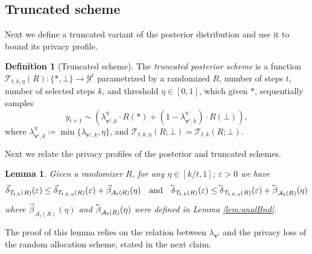 \documentclass{article}
\theoremstyle{plain}
\newtheorem{lemma}[theorem]{Lemma}
\theoremstyle{definition}
\newtheorem{definition}[theorem]{Definition}
\newcommand{\eps}{\varepsilon}
\newcommand{\lvec}[1]{\reflectbox{$\vec{\reflectbox{$#1$}}$}}
\newcommand{\out}{y}
\newcommand{\outDom}{\mathcal{Y}}
\newcommand{\rand}{R}
\newcommand{\view}{\boldsymbol{v}}
\newcommand{\alloc}[2]{\mathcal{A}_{#1}\left(#2\right)}
\newcommand{\post}[2]{\mathcal{T}_{#1}\left(#2\right)}
\newcommand{\postFunc}[3]{\mathcal{T}_{#1}\left(#2; #3\right)}
\newcommand{\add}[1]{\lvec{#1}}
\newcommand{\rem}[1]{\vec{#1}}
\newcommand{\privProfAdd}[1]{\add{\delta}_{#1}}
\newcommand{\privProfRem}[1]{\rem{\delta}_{#1}}
\begin{document}
\subsection{Truncated scheme}
Next we define a truncated variant of the posterior distribution and use it to bound its privacy profile.
\begin{definition}[Truncated scheme]\label{def:trncPostScm}
    The \emph{truncated posterior scheme} is a function $\post{t, k, \eta}{\rand}: \{*, \bot\} \rightarrow \outDom^{t}$ parametrized by a randomized $\rand$, number of steps $t$, number of selected steps $k$, and threshold $\eta \in [0, 1]$, which given $*$, sequentially samples
    \[
        \out_{i+1} \sim \left(\lambda_{\view^{i}, k}^{\eta} \cdot \rand(*) + (1-\lambda_{\view^{i}, k}^{\eta}) \cdot \rand(\bot) \right), 
    \]
    where $\lambda_{\view^{i}, k}^{\eta} \coloneqq \min \{\lambda_{\view^{i}, k},  \eta \}$, and $\postFunc{t, k, \eta}{\rand}{\bot} = \postFunc{t, k}{\rand}{\bot}$.
\end{definition}

Next we relate the privacy profiles of the posterior and truncated schemes.
\begin{lemma}\label{lem:truncPostBndPost}
    Given a randomizer $\rand$, for any $\eta \in [k/t,1]$; $\eps > 0$ we have
    \[
        \privProfRem{\post{t, k}{\rand}}(\eps) \le \privProfRem{\post{t, k, \eta}{\rand}}(\eps) + \rem{\beta}_{\alloc{t}{\rand}}(\eta) ~~~ \text{and} ~~~ \privProfAdd{\post{t, k}{\rand}}(\eps) \le \privProfAdd{\post{t, k, \eta}{\rand}}(\eps) + \add{\beta}_{\alloc{t}{\rand}}(\eta)
    \]
    where $\rem{\beta}_{\alloc{t}{\rand}}(\eta)$ and $\add{\beta}_{\alloc{t}{\rand}}(\eta)$ were defined in Lemma \ref{lem:analBnd}.
\end{lemma}

The proof of this lemma relies on the relation between $\lambda_{\view^{i}}$ and the privacy loss of the random allocation scheme, stated in the next claim.
\end{document}
